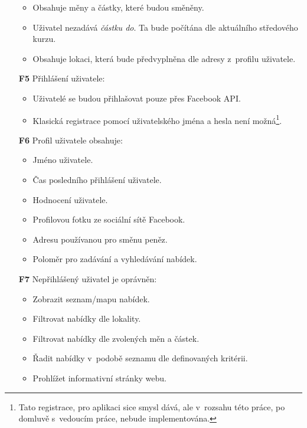 \begin{itemize}
        \begin{itemize}
            \item Obsahuje měny a částky, které budou směněny.
            \item Uživatel nezadává \textit{částku do}. Ta bude počítána dle aktuálního středového kurzu.
            \item Obsahuje lokaci, která bude předvyplněna dle adresy z~profilu uživatele.
        \end{itemize}
    \item[\textbf{F5}] Přihlášení uživatele:
        \begin{itemize}
            \item Uživatelé se budou přihlašovat pouze přes Facebook API.
            \item Klasická registrace pomocí uživatelského jména a hesla není možná\footnote{Tato registrace, pro aplikaci sice smysl dává, ale v~rozsahu této práce, po domluvě s~vedoucím práce, nebude implementována.}.
        \end{itemize}
    \item[\textbf{F6}] Profil uživatele obsahuje:
        \begin{itemize}
            \item Jméno uživatele.
            \item Čas posledního přihlášení uživatele.
            \item Hodnocení uživatele.
            \item Profilovou fotku ze sociální sítě Facebook.
            \item Adresu používanou pro směnu peněz.
            \item Poloměr pro zadávání a vyhledávání nabídek.
        \end{itemize}
    \item[\textbf{F7}] Nepřihlášený uživatel je oprávněn:
        \begin{itemize}
            \item Zobrazit seznam/mapu nabídek.
            \item Filtrovat nabídky dle lokality.
            \item Filtrovat nabídky dle zvolených měn a částek.
            \item Řadit nabídky v~podobě seznamu dle definovaných kritérii.
            \item Prohlížet informativní stránky webu.
        \end{itemize}
\end{itemize}


